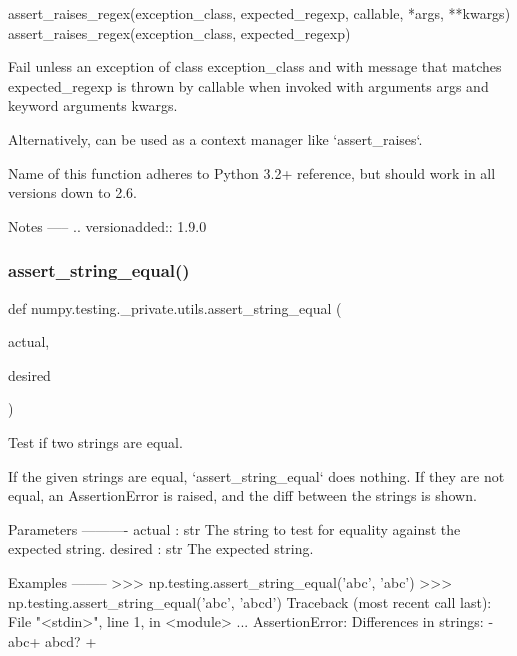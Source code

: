 \begin{DoxyVerb}assert_raises_regex(exception_class, expected_regexp, callable, *args,
                    **kwargs)
assert_raises_regex(exception_class, expected_regexp)

Fail unless an exception of class exception_class and with message that
matches expected_regexp is thrown by callable when invoked with arguments
args and keyword arguments kwargs.

Alternatively, can be used as a context manager like `assert_raises`.

Name of this function adheres to Python 3.2+ reference, but should work in
all versions down to 2.6.

Notes
-----
.. versionadded:: 1.9.0\end{DoxyVerb}
 \mbox{\label{namespacenumpy_1_1testing_1_1__private_1_1utils_a85e2c3231e3b30e38a9111f8edbfa5a7}} 
\subsubsection{\texorpdfstring{assert\+\_\+string\+\_\+equal()}{assert\_string\_equal()}}
{\footnotesize\ttfamily def numpy.\+testing.\+\_\+private.\+utils.\+assert\+\_\+string\+\_\+equal (\begin{DoxyParamCaption}\item[{}]{actual,  }\item[{}]{desired }\end{DoxyParamCaption})}

\begin{DoxyVerb}Test if two strings are equal.

If the given strings are equal, `assert_string_equal` does nothing.
If they are not equal, an AssertionError is raised, and the diff
between the strings is shown.

Parameters
----------
actual : str
    The string to test for equality against the expected string.
desired : str
    The expected string.

Examples
--------
>>> np.testing.assert_string_equal('abc', 'abc')
>>> np.testing.assert_string_equal('abc', 'abcd')
Traceback (most recent call last):
  File "<stdin>", line 1, in <module>
...
AssertionError: Differences in strings:
- abc+ abcd?    +\end{DoxyVerb}
 \mbox{\label{namespacenumpy_1_1testing_1_1__private_1_1utils_a64b071c82e9ecb8aad0515f7ba217e9d}} 
